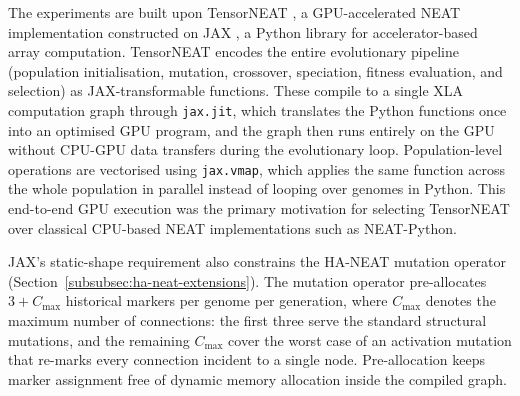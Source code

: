 \documentclass[12pt]{article}
\begin{document}
The experiments are built upon TensorNEAT \parencite{wang_tensorized_2024}, a GPU-accelerated NEAT implementation constructed on JAX \parencite{bradbury_jax_2018}, a Python library for accelerator-based array computation.
TensorNEAT encodes the entire evolutionary pipeline (population initialisation, mutation, crossover, speciation, fitness evaluation, and selection) as JAX-transformable functions. These compile to a single XLA computation graph through \texttt{jax.jit}, which translates the Python functions once into an optimised GPU program, and the graph then runs entirely on the GPU without CPU-GPU data transfers during the evolutionary loop.
Population-level operations are vectorised using \texttt{jax.vmap}, which applies the same function across the whole population in parallel instead of looping over genomes in Python.
This end-to-end GPU execution was the primary motivation for selecting TensorNEAT over classical CPU-based NEAT implementations such as NEAT-Python.

JAX's static-shape requirement also constrains the HA-NEAT mutation operator (Section~\ref{subsubsec:ha-neat-extensions}).
The mutation operator pre-allocates $3 + C_{\max}$ historical markers per genome per generation, where $C_{\max}$ denotes the maximum number of connections: the first three serve the standard structural mutations, and the remaining $C_{\max}$ cover the worst case of an activation mutation that re-marks every connection incident to a single node.
Pre-allocation keeps marker assignment free of dynamic memory allocation inside the compiled graph.
\end{document}
